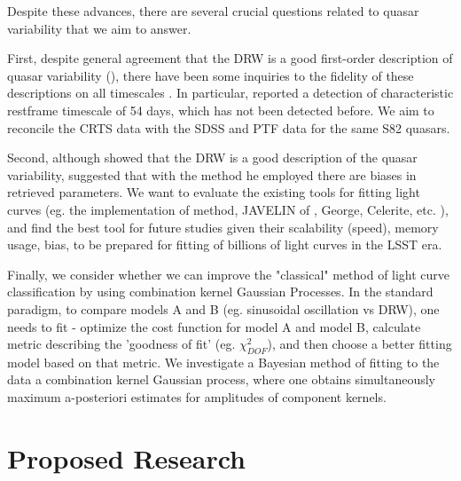 \documentclass[modern]{aastex62}
\begin{document}
Despite these advances, there are several crucial questions related to quasar variability  that we aim to answer.   

First, despite general agreement that the DRW is a good first-order description of quasar variability (\cite{zu2011,kozlowski2010, }), there have been some inquiries to the fidelity of these descriptions on all timescales \cite{zu2013, kasliwal2017a, kasliwal2017}. In particular, \cite{graham2014} reported  a detection of characteristic restframe timescale of 54 days, which has not been detected before.  We  aim to reconcile the CRTS data with the SDSS and PTF data for the same S82 quasars.

Second, although \cite{kelly2011} showed that the DRW is a good description of the quasar variability, \cite{kozlowski2017a} suggested that with the method he employed there are biases in retrieved parameters. We want to evaluate the existing tools for fitting light curves (eg. the implementation of \cite{rybicki1995} method, JAVELIN of \cite{zu2011}, George, Celerite, etc. ), and find the best tool for future studies given their scalability (speed), memory usage, bias, to be prepared for fitting of billions of light curves in the LSST era. 

Finally, we consider whether we can improve the "classical" method of light curve classification by using combination kernel Gaussian Processes. In the standard paradigm,  to compare models A and B (eg. sinusoidal oscillation vs DRW), one needs to fit  - optimize the cost function for model A and model B,  calculate metric describing the 'goodness of fit' (eg. $\chi^{2}_{DOF}$), and then choose a better fitting model based on that metric. We investigate a Bayesian method of fitting to the data a combination kernel Gaussian process, where one obtains simultaneously maximum a-posteriori estimates for  amplitudes of component kernels. 


\section{Proposed Research}
\end{document}
